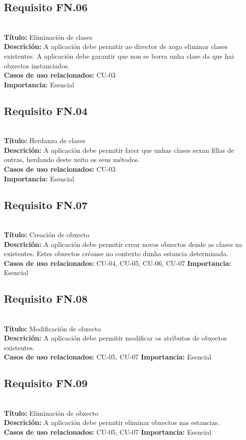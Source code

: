 \subsection{Requisito FN.06}~\\
{\bf Título:} Eliminación de clases\\
{\bf Descrición:} A aplicación debe permitir ao director de xogo eliminar clases existentes. A aplicación debe garantir que non se borra unha clase da que hai obxectos instanciados.\\
{\bf Casos de uso relacionados:} CU-03\\
{\bf Importancia:} Esencial

\subsection{Requisito FN.04}~\\
{\bf Título:} Herdanza de clases\\
{\bf Descrición:} A aplicación debe permitir facer que unhas clases sexan fillas de outras, herdando deste xeito os seus métodos.\\
{\bf Casos de uso relacionados:} CU-03\\
{\bf Importancia:} Esencial

\subsection{Requisito FN.07}~\\
{\bf Título:} Creación de obxecto\\
{\bf Descrición:} A aplicación debe permitir crear novos obxectos dende as clases xa existentes. Estes obxectos créanse no contexto dunha estancia determinada.\\
{\bf Casos de uso relacionados:} CU-04, CU-05, CU-06, CU-07
{\bf Importancia:} Esencial

\subsection{Requisito FN.08}~\\
{\bf Título:} Modificación de obxecto\\
{\bf Descrición:} A aplicación debe permitir modificar os atributos de obxectos existentes.\\
{\bf Casos de uso relacionados:} CU-05, CU-07
{\bf Importancia:} Esencial

\subsection{Requisito FN.09}~\\
{\bf Título:} Eliminación de obxecto\\
{\bf Descrición:} A aplicación debe permitir eliminar obxectos nas estancias.\\
{\bf Casos de uso relacionados:} CU-05, CU-07
{\bf Importancia:} Esencial

